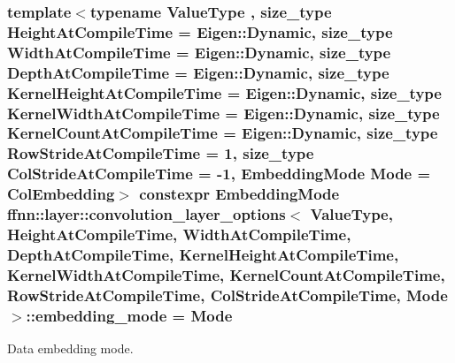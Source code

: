 \hypertarget{structffnn_1_1layer_1_1convolution__layer__options_a7f7a41732d32af9009d9c6185a4eef5a}{
\subsubsection[{embedding\-\_\-mode}]{\setlength{\rightskip}{0pt plus 5cm}template$<$typename Value\-Type , size\-\_\-type Height\-At\-Compile\-Time = Eigen\-::\-Dynamic, size\-\_\-type Width\-At\-Compile\-Time = Eigen\-::\-Dynamic, size\-\_\-type Depth\-At\-Compile\-Time = Eigen\-::\-Dynamic, size\-\_\-type Kernel\-Height\-At\-Compile\-Time = Eigen\-::\-Dynamic, size\-\_\-type Kernel\-Width\-At\-Compile\-Time = Eigen\-::\-Dynamic, size\-\_\-type Kernel\-Count\-At\-Compile\-Time = Eigen\-::\-Dynamic, size\-\_\-type Row\-Stride\-At\-Compile\-Time = 1, size\-\_\-type Col\-Stride\-At\-Compile\-Time = -\/1, Embedding\-Mode Mode = Col\-Embedding$>$ constexpr Embedding\-Mode {\bf ffnn\-::layer\-::convolution\-\_\-layer\-\_\-options}$<$ Value\-Type, Height\-At\-Compile\-Time, Width\-At\-Compile\-Time, Depth\-At\-Compile\-Time, Kernel\-Height\-At\-Compile\-Time, Kernel\-Width\-At\-Compile\-Time, Kernel\-Count\-At\-Compile\-Time, Row\-Stride\-At\-Compile\-Time, Col\-Stride\-At\-Compile\-Time, Mode $>$\-::embedding\-\_\-mode = Mode\hspace{0.3cm}{\ttfamily [static]}}}\label{structffnn_1_1layer_1_1convolution__layer__options_a7f7a41732d32af9009d9c6185a4eef5a}


Data embedding mode. 

